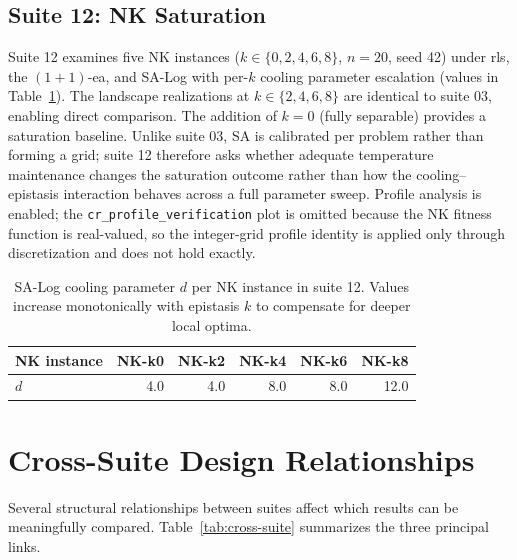 \subsection{Suite 12: NK Saturation}

Suite 12 examines five NK instances ($k \in \{0,2,4,6,8\}$, $n=20$, seed 42)
under \acrshort{rls}, the $(1+1)$-\acrshort{ea}, and SA-Log with per-$k$
cooling parameter escalation (values in
Table~\ref{tab:suite12-d}). The landscape realizations at
$k \in \{2,4,6,8\}$ are identical to suite 03, enabling direct comparison. The
addition of $k=0$ (fully separable) provides a saturation baseline. Unlike
suite 03, SA is calibrated per problem rather than forming a grid; suite 12
therefore asks whether adequate temperature maintenance changes the saturation
outcome rather than how the cooling--epistasis interaction behaves across a full
parameter sweep. Profile analysis is enabled; the
\texttt{cr\_profile\_verification} plot is omitted because the NK fitness
function is real-valued, so the integer-grid profile identity is applied only
through discretization and does not hold exactly.

\begin{table}[H]
  \centering
  \small
  \begin{tabular}{@{}lrrrrr@{}}
    \toprule
    \textbf{NK instance} & NK-k0 & NK-k2 & NK-k4 & NK-k6 & NK-k8 \\
    \midrule
    $d$ & 4.0 & 4.0 & 8.0 & 8.0 & 12.0 \\
    \bottomrule
  \end{tabular}
  \caption[Suite 12 SA-Log cooling parameters]{SA-Log cooling
    parameter $d$ per NK instance in suite 12.
    Values increase monotonically with epistasis $k$ to compensate for
  deeper local optima.}
  \label{tab:suite12-d}
\end{table}

\section{Cross-Suite Design Relationships}

Several structural relationships between suites affect which results can be
meaningfully compared. Table~\ref{tab:cross-suite} summarizes the three
principal links.

